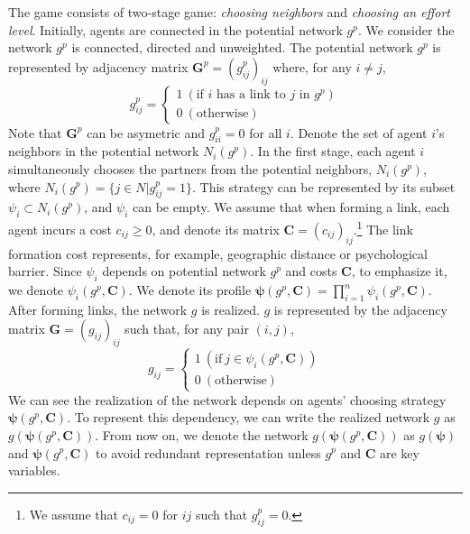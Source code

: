 \documentclass[12pt]{article}
\theoremstyle{definition}
\begin{document}
The game consists of two-stage game: {\it{choosing neighbors}} and {\it{choosing an effort level}}.
Initially, agents are connected in the potential network $g^p$.
We consider the network $g^p$ is connected, directed and unweighted.
The potential network $g^p$ is represented by adjacency matrix $\bm{G}^p = {(g_{ij}^p)}_{ij}$ where, for any $i \neq j$,
\[ g_{ij}^p =
	\begin{cases}
		1 \  (\text{if $i$ has a link to $j$ in $g^p $}) \\
		0 \  (\text{otherwise})
	\end{cases} \]
Note that $\bm{G}^p$ can be asymetric and $g_{ii}^p = 0$ for all $i$.
Denote the set of agent $i$'s neighbors in the potential network $N_i(g^p)$.
In the first stage, each agent $i$ simultaneously chooses the partners from the potential neighbors, $N_i(g^p)$, where $N_i(g^p) = \{ j \in N | g_{ij}^p = 1 \}$.
This strategy can be represented by its subset $\psi_i \subset N_i(g^p)$, and $\psi_i$ can be empty.
We assume that when forming a link, each agent incurs a cost $c_{ij} \ge 0$, and denote its matrix $\bm{C} = {(c_{ij})}_{ij}$.\footnote{We assume that $c_{ij} = 0$ for $ij$ such that $g_{ij}^p = 0$.}
The link formation cost represents, for example, geographic distance or psychological barrier.
Since $\psi_i$ depends on potential network $g^p$ and costs $\bm{C}$, to emphasize it, we denote $\psi_i(g^p, \bm{C})$.
We denote its profile $\bm{\psi}(g^p, \bm{C}) = \prod_{i=1}^n \psi_i(g^p, \bm{C})$.
After forming links, the network $g$ is realized.
$g$ is represented by the adjacency matrix $\bm{G} = {(g_{ij})}_{ij}$ such that, for any pair $(i,j)$,
\[ g_{ij} = 
	\begin{cases}
		1 \  (\text{if} \  j \in \psi_i(g^p, {\bm{C}}) ) \\
		0 \  (\text{otherwise})
	\end{cases} \]
We can see the realization of the network depends on agents' choosing strategy $\bm{\psi}(g^p, \bm{C})$.
To represent this dependency, we can write the realized network $g$ as $g(\bm{\psi}(g^p, \bm{C}))$.
From now on, we denote the network $g(\bm{\psi}(g^p, \bm{C}))$ as $g(\bm{\psi})$ and $\bm{\psi}(g^p, \bm{C})$ to avoid redundant representation unless $g^p$ and $\bm{C}$ are key variables.
\end{document}
